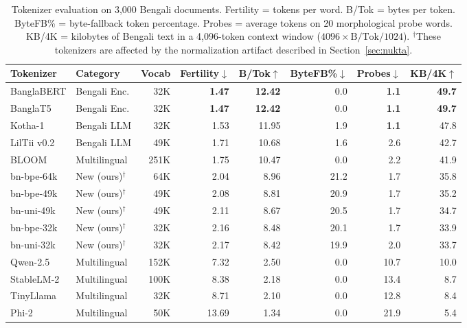 \documentclass[11pt,a4paper]{article}
\begin{document}
\begin{table}[!ht]
\centering
\small
\begin{tabular}{llrrrrrr}
\toprule
\textbf{Tokenizer} & \textbf{Category} & \textbf{Vocab} & \textbf{Fertility}$\downarrow$ & \textbf{B/Tok}$\uparrow$ & \textbf{ByteFB\%}$\downarrow$ & \textbf{Probes}$\downarrow$ & \textbf{KB/4K}$\uparrow$ \\
\midrule
BanglaBERT & Bengali Enc. & 32K & \textbf{1.47} & \textbf{12.42} & 0.0 & \textbf{1.1} & \textbf{49.7} \\
BanglaT5 & Bengali Enc. & 32K & \textbf{1.47} & \textbf{12.42} & 0.0 & \textbf{1.1} & \textbf{49.7} \\
Kotha-1 & Bengali LLM & 32K & 1.53 & 11.95 & 1.9 & \textbf{1.1} & 47.8 \\
LilTii v0.2 & Bengali LLM & 49K & 1.71 & 10.68 & 1.6 & 2.6 & 42.7 \\
BLOOM & Multilingual & 251K & 1.75 & 10.47 & 0.0 & 2.2 & 41.9 \\
\midrule
bn-bpe-64k & New (ours)$^\dagger$ & 64K & 2.04 & 8.96 & 21.2 & 1.7 & 35.8 \\
bn-bpe-49k & New (ours)$^\dagger$ & 49K & 2.08 & 8.81 & 20.9 & 1.7 & 35.2 \\
bn-uni-49k & New (ours)$^\dagger$ & 49K & 2.11 & 8.67 & 20.5 & 1.7 & 34.7 \\
bn-bpe-32k & New (ours)$^\dagger$ & 32K & 2.16 & 8.48 & 20.1 & 1.7 & 33.9 \\
bn-uni-32k & New (ours)$^\dagger$ & 32K & 2.17 & 8.42 & 19.9 & 2.0 & 33.7 \\
\midrule
Qwen-2.5 & Multilingual & 152K & 7.32 & 2.50 & 0.0 & 10.7 & 10.0 \\
StableLM-2 & Multilingual & 100K & 8.38 & 2.18 & 0.0 & 13.4 & 8.7 \\
TinyLlama & Multilingual & 32K & 8.71 & 2.10 & 0.0 & 12.8 & 8.4 \\
Phi-2 & Multilingual & 50K & 13.69 & 1.34 & 0.0 & 21.9 & 5.4 \\
\bottomrule
\end{tabular}
\caption{Tokenizer evaluation on 3,000 Bengali documents. Fertility = tokens per word. B/Tok = bytes per token. ByteFB\% = byte-fallback token percentage. Probes = average tokens on 20 morphological probe words. KB/4K = kilobytes of Bengali text in a 4,096-token context window ($4096 \times \text{B/Tok} / 1024$). $^\dagger$These tokenizers are affected by the normalization artifact described in Section~\ref{sec:nukta}.}
\label{tab:main}
\end{table}
\end{document}
